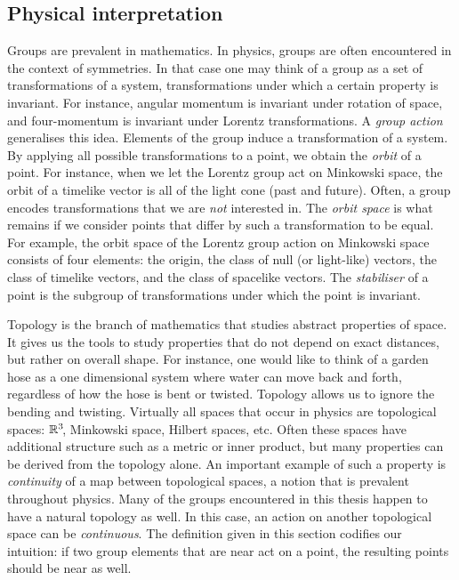 \subsection*{Physical interpretation}
Groups are prevalent in mathematics.
In physics, groups are often encountered in the context of symmetries.
In that case one may think of a group as a set of transformations of a system,
transformations under which a certain property is invariant.
For instance, angular momentum is invariant under rotation of space,
and four-momentum is invariant under Lorentz transformations.
A \emph{group action} generalises this idea.
Elements of the group induce a transformation of a system.
By applying all possible transformations to a point,
we obtain the \emph{orbit} of a point.
For instance, when we let the Lorentz group act on Minkowski space,
the orbit of a timelike vector is all of the light cone (past and future).
Often, a group encodes transformations that we are \emph{not} interested in.
The \emph{orbit space} is what remains if we consider points that differ
by such a transformation to be equal.
For example, the orbit space of the Lorentz group action on Minkowski space
consists of four elements:
the origin, the class of null (or light-like) vectors,
the class of timelike vectors,
and the class of spacelike vectors.
The \emph{stabiliser} of a point is the subgroup of transformations under which the point is invariant.

Topology is the branch of mathematics that studies abstract properties of space.
It gives us the tools to study properties that do not depend
on exact distances, but rather on overall shape.
For instance, one would like to think of a garden hose
as a one dimensional system where water can move back and forth,
regardless of how the hose is bent or twisted.
Topology allows us to ignore the bending and twisting.
Virtually all spaces that occur in physics are topological spaces:
$\mathbb{R}^3\!$, Minkowski space, Hilbert spaces, etc.
Often these spaces have additional structure
such as a metric or inner product,
but many properties can be derived from the topology alone.
An important example of such a property
is \emph{continuity} of a map between topological spaces,
a notion that is prevalent throughout physics.
Many of the groups encountered in this thesis happen to have a natural topology as well.
In this case, an action on another topological space can be \emph{continuous}.
The definition given in this section codifies our intuition:
if two group elements that are near act on a point,
the resulting points should be near as well.

